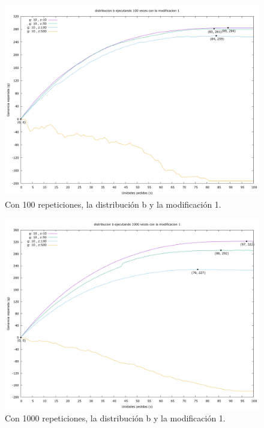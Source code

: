 \documentclass[12pt, spanish]{article}
\begin{document}
\begin{figure}[H]
	\centering
	\includegraphics[scale = 0.2]{prob_b/datos_b_100_1.png}
	\caption{Con 100 repeticiones, la distribución b y la modificación 1.}
	\label{fig:ej1_a_100}

\end{figure}

\begin{figure}[H]
	\centering
	\includegraphics[scale = 0.2]{prob_b/datos_b_1000_1.png}
	\caption{Con 1000 repeticiones, la distribución b y la modificación 1.}
	\label{fig:ej1_a_1000}

\end{figure}
\end{document}
